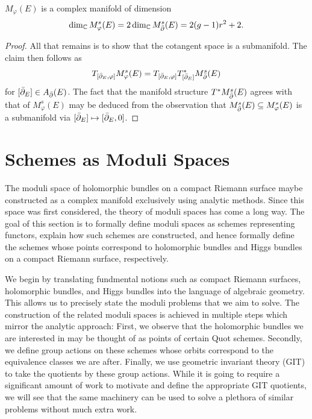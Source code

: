 \documentclass[12pt]{ociamthesis}  %
\begin{document}
\begin{corollary}
  $M_\varphi(E)$ is a complex manifold of dimension
  \begin{align*}
    \dim_{\mathbb C}M^s_{\varphi}(E)
    =2\dim_{\mathbb C}M^s_{\bar{\partial}}(E)
    =2(g-1)r^2 + 2.
  \end{align*}
  \begin{proof}
    All that remains is to show that the cotangent space is a submanifold.
    The claim then follows as
    \begin{align*}
      T_{[{\bar{\partial}}_E,\varphi]}M^s_\varphi(E) = T_{[{\bar{\partial}}_E,\varphi]} T^*_{[{\bar{\partial}}_E]}M^s_{\bar{\partial}}(E)
    \end{align*}
    for $[{\bar{\partial}}_E]\in A_{\bar{\partial}}(E)$. The fact that the manifold
    structure $T^*M^s_{\bar{\partial}}(E)$ agrees with that of $M^s_{\varphi}(E)$
    may be deduced from the observation that
    $M^s_{\bar{\partial}}(E) \subseteq M^s_\varphi(E)$ is a submanifold
    via $[{\bar{\partial}}_E] \mapsto [{\bar{\partial}}_E,0]$.
  \end{proof}
\end{corollary}

\chapter{Schemes as Moduli Spaces}

The moduli space of holomorphic bundles on a compact Riemann
surface maybe constructed as a complex manifold exclusively
using analytic methods. Since this space was first considered,
the theory of moduli spaces has come a long way.
The goal of this section is to formally define moduli spaces
as schemes representing functors, explain how such schemes
are constructed, and hence formally define the schemes whose
points correspond to holomorphic bundles and Higgs bundles
on a compact Riemann surface, respectively.

We begin by translating fundmental notions such as compact
Riemann surfaces, holomorphic bundles, and Higgs bundles into
the language of algebraic geometry. This allows us to precisely state
the moduli problems that we aim to solve. The construction
of the related moduli spaces is achieved in multiple steps which
mirror the analytic approach: First, we observe that the
holomorphic bundles we are interested in may be thought of as
points of certain Quot schemes. Secondly, we define group
actions on these schemes whose orbits correspond to the
equivalence classes we are after. Finally, we use geometric
invariant theory (GIT) to take the quotients by these group
actions. While it is going to require a significant amount of
work to motivate and define the appropriate GIT quotients,
we will see that the same machinery can be used to solve
a plethora of similar problems without much extra work.
\end{document}
